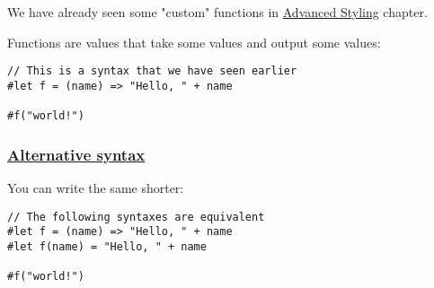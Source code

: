 We have already seen some "custom" functions in
\href{../tutorial/advanced_styling.html}{Advanced Styling} chapter.

Functions are values that take some values and output some values:

\begin{verbatim}
// This is a syntax that we have seen earlier
#let f = (name) => "Hello, " + name

#f("world!")
\end{verbatim}

\pandocbounded{}

\subsubsection{\texorpdfstring{\hyperref[alternative-syntax]{Alternative
syntax}}{Alternative syntax}}\label{alternative-syntax}

You can write the same shorter:

\begin{verbatim}
// The following syntaxes are equivalent
#let f = (name) => "Hello, " + name
#let f(name) = "Hello, " + name

#f("world!")
\end{verbatim}

\pandocbounded{}
